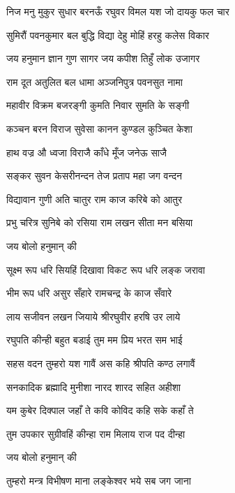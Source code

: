 
\setlength{\columnsep}{10pt}\newpage
{}
\begin{large}
\begin{multicols}{2}
{निज मनु मुकुर सुधार}
{बरनऊँ रघुवर विमल यश}
{जो दायकु फल चार}

{सुमिरौं पवनकुमार}
{बल बुद्धि विद्या देहु मोहिं}
{हरहु कलेस विकार}

\resetShloka
\twolineshloka
{जय हनुमान ज्ञान गुण सागर}
{जय कपीश तिहुँ लोक उजागर}

\twolineshloka
{राम दूत अतुलित बल धामा}
{अञ्जनिपुत्र पवनसुत नामा}

\twolineshloka
{महावीर विक्रम बजरङ्गी}
{कुमति निवार सुमति के सङ्गी}

\twolineshloka
{कञ्चन बरन विराज सुवेसा}
{कानन कुण्डल कुञ्चित केशा}

\twolineshloka
{हाथ वज्र औ ध्वजा विराजै}
{काँधे मूँज जनेऊ साजै}

\twolineshloka
{सङ्कर सुवन केसरीनन्दन}
{तेज प्रताप महा जग वन्दन}

\twolineshloka
{विद्यावान गुणी अति चातुर}
{राम काज करिबे को आतुर}

\twolineshloka
{प्रभु चरित्र सुनिबे को रसिया}
{राम लखन सीता मन बसिया}

{जय बोलो हनुमान् की}

\twolineshloka
{सूक्ष्म रूप धरि सियहिं दिखावा}
{विकट रूप धरि लङ्क जरावा}

\twolineshloka
{भीम रूप धरि असुर सँहारे}
{रामचन्द्र के काज सँवारे}

\twolineshloka
{लाय सजीवन लखन जियाये}
{श्रीरघुवीर हरषि उर लाये}

\twolineshloka
{रघुपति कीन्ही बहुत बडाई}
{तुम मम प्रिय भरत सम भाई}

\twolineshloka
{सहस वदन तुम्हरो यश गावैं}
{अस कहि श्रीपति कण्ठ लगावैं}

\twolineshloka
{सनकादिक ब्रह्मादि मुनीशा}
{नारद शारद सहित अहीशा}

\twolineshloka
{यम कुबेर दिक्पाल जहाँ ते}
{कवि कोविद कहि सके कहाँ ते}

\twolineshloka
{तुम उपकार सुग्रीवहिं कीन्हा}
{राम मिलाय राज पद दीन्हा}

{जय बोलो हनुमान् की}

\twolineshloka
{तुम्हरो मन्त्र विभीषण माना}
{लङ्केश्वर भये सब जग जाना}


\end{multicols}
\end{large}
